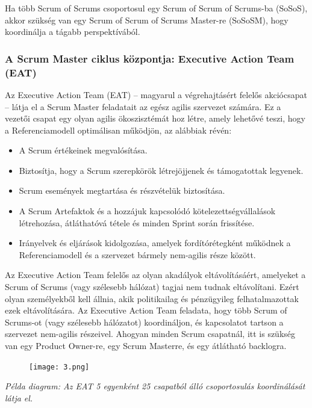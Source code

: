 \documentclass[12pt,a4paper,parskip=full]{scrartcl}
\begin{document}
Ha több Scrum of Scrums csoportosul egy Scrum of Scrum of Scrums-ba (SoSoS), akkor szükség van egy Scrum of Scrum of Scrums Master-re (SoSoSM), hogy koordinálja a tágabb perspektívából.

\subsubsection{A Scrum Master ciklus központja: Executive Action Team (EAT)}\label{the-hub-of-the-sm-cycle}

Az Executive Action Team (EAT) – magyarul a végrehajtásért felelős akciócsapat – látja el a Scrum Master feladatait az egész agilis szervezet számára. Ez a vezetői csapat egy olyan agilis ökoszisztémát hoz létre, amely lehetővé teszi, hogy a Referenciamodell optimálisan működjön, az alábbiak révén:

\begin{itemize}
\itemsep1pt\parskip0pt
\item
 A Scrum értékeinek megvalósítása.
\item
 Biztosítja, hogy a Scrum szerepkörök létrejöjjenek és támogatottak legyenek.
\item
 Scrum események megtartása és részvételük biztosítása.
\item
 A Scrum Artefaktok és a hozzájuk kapcsolódó kötelezettségvállalások létrehozása, átláthatóvá tétele és minden Sprint során frissítése.
\item
 Irányelvek és eljárások kidolgozása, amelyek fordítórétegként működnek a Referenciamodell és a szervezet bármely nem-agilis része között.
\end{itemize}

Az Executive Action Team felelős az olyan akadályok eltávolításáért, amelyeket a Scrum of Scrums (vagy szélesebb hálózat) tagjai nem tudnak eltávolítani. Ezért olyan személyekből kell állnia, akik politikailag és pénzügyileg felhatalmazottak ezek eltávolítására. Az Executive Action Team feladata, hogy több Scrum of Scrums-ot (vagy szélesebb hálózatot) koordináljon, és kapcsolatot tartson a szervezet nem-agilis részeivel. Ahogyan minden Scrum csapatnál, itt is szükség van egy Product Owner-re, egy Scrum Masterre, és egy átlátható backlogra.

\begin{figure}[H]
    \centering
    \texttt{[image: 3.png]}
\end{figure}

\emph{Példa diagram: Az EAT 5 egyenként 25 csapatból álló csoportosulás koordinálását látja el.}
\end{document}
